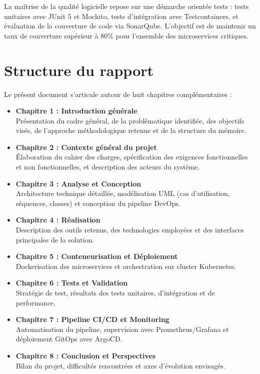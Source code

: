 La maîtrise de la qualité logicielle repose sur une démarche orientée tests :
tests unitaires avec JUnit 5 et Mockito, tests d'intégration avec Testcontainers,
et évaluation de la couverture de code via SonarQube. L'objectif est de maintenir
un taux de couverture supérieur à 80\% pour l'ensemble des microservices critiques.

\section{Structure du rapport}

Le présent document s'articule autour de huit chapitres complémentaires :

\begin{itemize}
  \item \textbf{Chapitre 1 : Introduction générale}\\
    Présentation du cadre général, de la problématique identifiée, des objectifs
    visés, de l'approche méthodologique retenue et de la structure du mémoire.

  \item \textbf{Chapitre 2 : Contexte général du projet}\\
    Élaboration du cahier des charges, spécification des exigences fonctionnelles
    et non fonctionnelles, et description des acteurs du système.

  \item \textbf{Chapitre 3 : Analyse et Conception}\\
    Architecture technique détaillée, modélisation UML (cas d'utilisation,
    séquences, classes) et conception du pipeline DevOps.

  \item \textbf{Chapitre 4 : Réalisation}\\
    Description des outils retenus, des technologies employées et des interfaces
    principales de la solution.

  \item \textbf{Chapitre 5 : Conteneurisation et Déploiement}\\
    Dockerisation des microservices et orchestration sur cluster Kubernetes.

  \item \textbf{Chapitre 6 : Tests et Validation}\\
    Stratégie de test, résultats des tests unitaires, d'intégration et de
    performance.

  \item \textbf{Chapitre 7 : Pipeline CI/CD et Monitoring}\\
    Automatisation du pipeline, supervision avec Prometheus/Grafana et
    déploiement GitOps avec ArgoCD.

  \item \textbf{Chapitre 8 : Conclusion et Perspectives}\\
    Bilan du projet, difficultés rencontrées et axes d'évolution envisagés.
\end{itemize}
